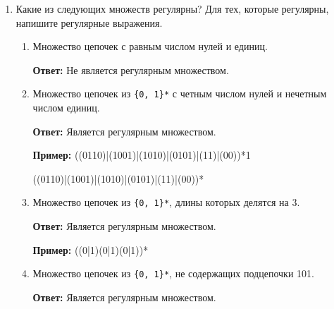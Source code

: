 \documentclass{bmstu}
\begin{document}
\begin{enumerate}
    \item Какие из следующих множеств регулярны? Для тех, которые регулярны, напишите регулярные выражения.
    \begin{enumerate}
        \item Множество цепочек с равным числом нулей и единиц.
        
        \textbf{Ответ:} Не является регулярным множеством.

        \item Множество цепочек из \texttt{\{0, 1\}*} с четным числом нулей и нечетным числом единиц.
        
        \textbf{Ответ:} Является регулярным множеством. 

        \textbf{Пример:} ((0110)|(1001)|(1010)|(0101)|(11)|(00))*1
        
        ((0110)|(1001)|(1010)|(0101)|(11)|(00))*

        \item Множество цепочек из \texttt{\{0, 1\}*}, длины которых делятся на 3.
        
        \textbf{Ответ:} Является регулярным множеством. 

        \textbf{Пример:} ((0|1)(0|1)(0|1))*

        \item Множество цепочек из \texttt{\{0, 1\}*}, не содержащих подцепочки 101.
        
        \textbf{Ответ:} Является регулярным множеством. 


\end{enumerate}
\end{enumerate}
\end{document}
